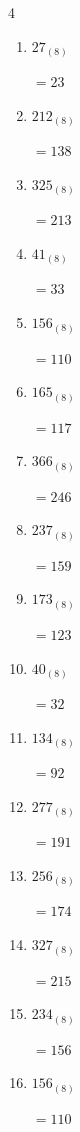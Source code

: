 \begin{multicols}{4}
\begin{enumerate}
  \item $27_{(8)}$

        $=23$

\columnbreak %

\resetques

  \item $212_{(8)}$

        $=138$

  \item $325_{(8)}$

        $=213$

  \item $41_{(8)}$

        $=33$

  \item $156_{(8)}$

        $=110$

  \item $165_{(8)}$

        $=117$

  \item $366_{(8)}$

        $=246$

  \item $237_{(8)}$

        $=159$

  \item $173_{(8)}$

        $=123$

  \item $40_{(8)}$

        $=32$

  \item $134_{(8)}$

        $=92$

  \item $277_{(8)}$

        $=191$

  \item $256_{(8)}$

        $=174$

  \item $327_{(8)}$

        $=215$

  \item $234_{(8)}$

        $=156$

  \item $156_{(8)}$

        $=110$


\end{enumerate}
\end{multicols}
